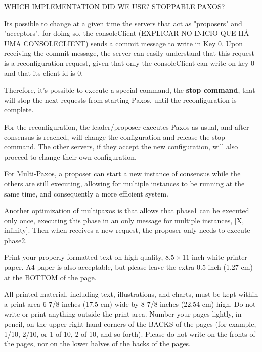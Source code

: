 \documentclass[times, 10pt,twocolumn]{article}
\begin{document}
WHICH IMPLEMENTATION DID WE USE? STOPPABLE PAXOS?

Its possible to change at a given time the servers that act as "proposers"
and "acceptors", for doing so, the consoleClient (EXPLICAR NO INICIO QUE HÁ UMA 
CONSOLECLIENT) sends a commit message to 
write in Key 0. Upon receiving the commit message, the server can easily 
understand that this request is a reconfiguration request, given that only the 
consoleClient can write on key 0 and that its client id is 0.

Therefore, it's possible to execute a special command, the \textbf{stop command},
that will stop the next requests from starting Paxos, until the reconfiguration
is complete. 

For the reconfiguration, the leader/proposer executes Paxos as usual, and after
consensus is reached, will change the configuration and release the stop 
command. The other servers, if they accept the new configuration, will also
proceed to change their own configuration.

For Multi-Paxos, a proposer can start a new instance of consensus while the 
others are still executing, allowing for multiple instances to be running at the
same time, and consequently a more efficient system.

Another optimization of multipaxos is that allows that phase1 can be executed
only once, executing this phase in an only message for multiple instances,
[X, infinity]. Then when receives a new request, the proposer only needs to
execute phase2.



Print your properly formatted text on high-quality, $8.5 \times 11$-inch 
white printer paper. A4 paper is also acceptable, but please leave the 
extra 0.5 inch (1.27 cm) at the BOTTOM of the page.


All printed material, including text, illustrations, and charts, must be 
kept within a print area 6-7/8 inches (17.5 cm) wide by 8-7/8 inches 
(22.54 cm) high. Do not write or print anything outside the print area. 
Number your pages lightly, in pencil, on the upper right-hand corners of 
the BACKS of the pages (for example, 1/10, 2/10, or 1 of 10, 2 of 10, and 
so forth). Please do not write on the fronts of the pages, nor on the 
lower halves of the backs of the pages.
\end{document}
